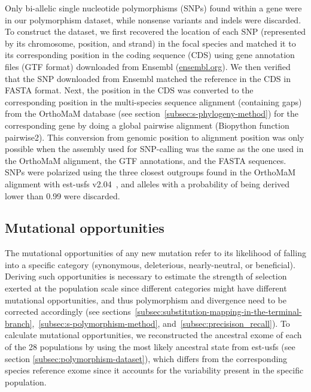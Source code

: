 \documentclass[9pt,twocolumn,twoside,lineno]{pnas-new}
\begin{document}
{       Only bi-allelic single nucleotide polymorphisms (SNPs) found within a gene were in our polymorphism dataset, while nonsense variants and indels were discarded.
       To construct the dataset, we first recovered the location of each SNP (represented by its chromosome, position, and strand) in the focal species and matched it to its corresponding position in the coding sequence (CDS) using gene annotation files (GTF format) downloaded from Ensembl (\url{ensembl.org}).
       We then verified that the SNP downloaded from Ensembl matched the reference in the CDS in FASTA format.
       Next, the position in the CDS was converted to the corresponding position in the multi-species sequence alignment (containing gaps) from the OrthoMaM database (see section~\ref{subsec:s-phylogeny-method}) for the corresponding gene by doing a global pairwise alignment (Biopython function pairwise2).
       This conversion from genomic position to alignment position was only possible when the assembly used for SNP-calling was the same as the one used in the OrthoMaM alignment, the GTF annotations, and the FASTA sequences.
       SNPs were polarized using the three closest outgroups found in the OrthoMaM alignment with est-usfs v2.04~\cite{keightley_inferring_2018}, and alleles with a probability of being derived lower than 0.99 were discarded.

       \subsection{Mutational opportunities}
       \label{subsec:nunber-of-sites}
       The mutational opportunities of any new mutation refer to its likelihood of falling into a specific category (synonymous, deleterious, nearly-neutral, or beneficial).
       Deriving such opportunities is necessary to estimate the strength of selection exerted at the population scale since different categories might have different mutational opportunities, and thus polymorphism and divergence need to be corrected accordingly (see sections~\ref{subsec:substitution-mapping-in-the-terminal-branch},~\ref{subsec:s-polymorphism-method}, and~\ref{subsec:precisison_recall}).
       To calculate mutational opportunities, we reconstructed the ancestral exome of each of the 28 populations by using the most likely ancestral state from est-usfs (see section \ref{subsec:polymorphism-dataset}), which differs from the corresponding species reference exome since it accounts for the variability present in the specific population.

}
\end{document}
